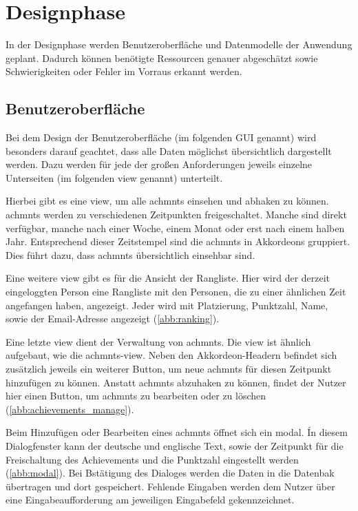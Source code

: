 \documentclass[11pt]{article}
\begin{document}
%
%

\section{Designphase}
In der Designphase werden Benutzeroberfläche und Datenmodelle der Anwendung geplant. Dadurch können benötigte Ressourcen
genauer abgeschätzt sowie Schwierigkeiten oder Fehler im Vorraus erkannt werden. 

\subsection{Benutzeroberfläche}


Bei dem Design der Benutzeroberfläche (im folgenden GUI genannt) wird
besonders darauf geachtet, dass alle Daten möglichst übersichtlich
dargestellt werden. Dazu werden für jede der großen Anforderungen
jeweils einzelne Unterseiten (im folgenden \Gls{view} genannt) unterteilt. 

Hierbei gibt es eine \Gls{view}, um alle \glspl{achmnt} einsehen
und abhaken zu können. \Glspl{achmnt} werden zu verschiedenen
Zeitpunkten freigeschaltet. Manche sind direkt verfügbar, manche 
nach einer Woche, einem Monat oder erst nach einem halben Jahr. 
Entsprechend dieser Zeitstempel sind die \glspl{achmnt} in Akkordeons
gruppiert. Dies führt dazu, dass \glspl{achmnt} übersichtlich einsehbar
sind.

Eine weitere \Gls{view} gibt es für die Ansicht der Rangliste. Hier wird
der derzeit eingeloggten Person eine Rangliste mit den Personen, die
zu einer ähnlichen Zeit angefangen haben, angezeigt. Jeder wird mit Platzierung,
Punktzahl, Name, sowie der Email-Adresse angezeigt (\autoref{abb:ranking}).

Eine letzte \Gls{view} dient der Verwaltung von \Glspl{achmnt}.
Die \Gls{view} ist ähnlich aufgebaut, wie die \glspl{achmnt}-\Gls{view}. Neben den Akkordeon-Headern befindet sich
zusätzlich jeweils ein weiterer Button, um neue \glspl{achmnt} für diesen Zeitpunkt
hinzufügen zu können. Anstatt \glspl{achmnt} abzuhaken zu können, findet der Nutzer hier
einen Button, um \glspl{achmnt} zu bearbeiten oder zu löschen (\autoref{abb:achievements_manage}).

Beim Hinzufügen oder Bearbeiten eines \glspl{achmnt} öffnet sich ein
\Gls{modal}. Ín diesem Dialogfenster kann der deutsche und englische Text, sowie der
Zeitpunkt für die Freischaltung des Achievements und die Punktzahl eingestellt werden (\autoref{abb:modal}). 
Bei Bstätigung des Dialoges werden die Daten in die Datenbak übertragen und dort gespeichert.
Fehlende Eingaben werden dem Nutzer über eine Eingabeaufforderung am jeweiligen Eingabefeld gekennzeichnet.
\end{document}

